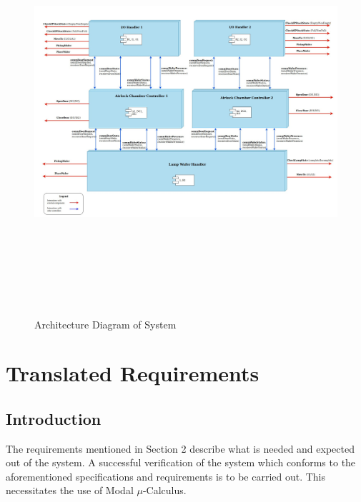 \documentclass[a4paper,12pt]{article}
\begin{document}
\begin{figure}[ht]
\centering
    \includegraphics[width=\textwidth, height=15cm]{Architecture-final.jpg}
  \caption{Architecture Diagram of System}
  \label{fig:arch1}
\end{figure}
\newpage
\section{Translated Requirements}
\subsection{Introduction}
The requirements mentioned in Section 2 describe what is needed and expected out of the system. A successful verification of the system which conforms to the aforementioned specifications and requirements is to be carried out. This necessitates the use of Modal $\mu$-Calculus.   
\end{document}
